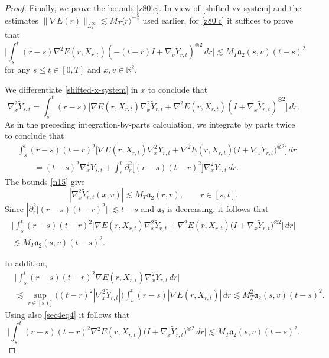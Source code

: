 \documentclass[reqno,11pt]{amsart}
\numberwithin{equation}{section}
\def\R{{\mathbb R}}
\def\R{{\bf R}}
\def\R{\mathbb{R}}
\begin{document}
\begin{proof}
Finally, we prove the bounds \eqref{z80'c}. In view of \eqref{shifted-vv-system} and the estimates $\|\nabla E(r)\|_{L^\infty_x}\lesssim M_T\langle r\rangle^{-\frac52}$ used earlier, for \eqref{z80'c} it suffices to prove that
\begin{equation}\label{sec4eq3}
\Big|\int_s^t(r-s)\nabla^2E(r,X_{r,t})(-(t-r)I+\nabla_v\widetilde Y_{r,t})^{\otimes 2}\,dr\Big|\lesssim M_T\mathfrak{a}_2(s,v)(t-s)^2
\end{equation}
for any $s\leq t\in[0,T]$ and $x,v\in\R^2$.

We differentiate \eqref{shifted-x-system} in $x$ to conclude that 
\begin{equation*}
\nabla_x^2\widetilde{Y}_{s,t}=\int_s^t(r-s)\Big[\nabla E(r,X_{r,t})\nabla_x^2\widetilde Y_{r,t}+
	\nabla^2E(r,X_{r,t})(I+\nabla_x\widetilde Y_{r,t})^{\otimes 2}\Big]\,dr.
\end{equation*}
As in the preceding integration-by-parts calculation, we integrate by parts twice to conclude that
\begin{align*}
&\int_s^t(r-s)(t-r)^2\Big[\nabla E(r,X_{r,t})\nabla_x^2\widetilde Y_{r,t}+\nabla^2E(r,X_{r,t})\big(I+\nabla_x\widetilde Y_{r,t}\big)^{\otimes2}\Big]\,dr\\
&\qquad=(t-s)^2\nabla_x^2\widetilde Y_{s,t}+\int_s^t\partial_r^2\big[(r-s)(t-r)^2\big]\nabla_x^2\widetilde Y_{r,t}\,dr.
\end{align*}
The bounds \eqref{n15} give
\begin{equation*}
|\nabla_x^2\widetilde Y_{r,t}(x,v)|\lesssim M_T\mathfrak a_2(r,v),\qquad r\in[s,t].
\end{equation*}
Since $\left|\partial_r^2\big[(r-s)(t-r)^2\big]\right|\lesssim t-s$ and $\mathfrak a_2$ is decreasing, it follows that
\begin{equation}\label{sec4eq4}
\begin{split}
\Big|\int_s^t(r-s)(t-r)^2\Big[\nabla E(r,X_{r,t})\nabla_x^2\widetilde Y_{r,t}
+\nabla^2E(r,X_{r,t})\big(I+\nabla_x\widetilde Y_{r,t}\big)^{\otimes2}\Big]\,dr\Big|\\
\lesssim M_T\mathfrak a_2(s,v)(t-s)^2.
\end{split}
\end{equation}

In addition,
\begin{align*}
&\Big|\int_s^t(r-s)(t-r)^2\nabla E(r,X_{r,t})\nabla_x^2\widetilde Y_{r,t}\,dr\Big|\\
&\lesssim
\sup_{r\in[s,t]}\big((t-r)^2|\nabla_x^2\widetilde Y_{r,t}|\big)\int_s^t(r-s)|\nabla E(r,X_{r,t})|\,dr\lesssim
M_T^2\mathfrak a_2(s,v)(t-s)^2.
\end{align*}
Using also \eqref{sec4eq4} it follows that
\begin{equation}\label{sec4eq5}
\Big|\int_s^t(r-s)(t-r)^2\nabla^2E(r,X_{r,t})\big(I+\nabla_x\widetilde Y_{r,t}\big)^{\otimes2}\,dr\Big|
\lesssim M_T\mathfrak a_2(s,v)(t-s)^2.
\end{equation}


\end{proof}
\end{document}
